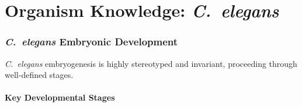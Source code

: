 \documentclass[11pt,letterpaper]{article}
\begin{document}
\newpage


\part*{Organism Knowledge: \textit{C.\ elegans}}

\section{\textit{C.\ elegans} Embryonic Development}

\textit{C.\ elegans} embryogenesis is highly stereotyped and invariant, proceeding through well-defined stages.

\subsection{Key Developmental Stages}
\end{document}
